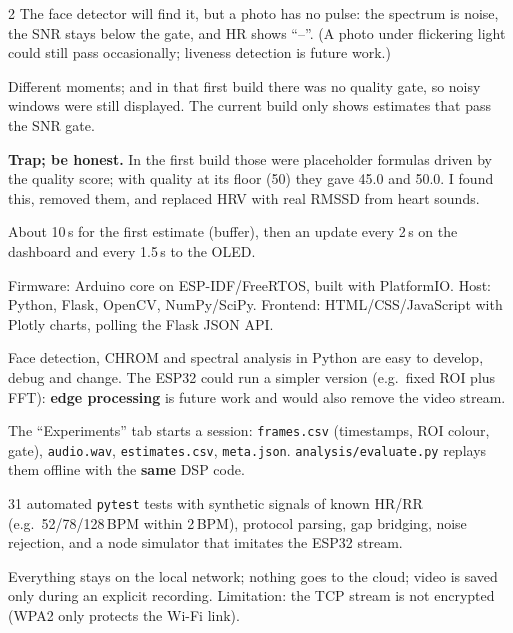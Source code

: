 \begin{multicols}{2}
{The face detector will find it, but a photo has no pulse: the spectrum is noise, the SNR stays below the gate, and HR shows
``--''. (A photo under flickering light could still pass occasionally; liveness detection is future work.)}

{Different moments; and in that first build there was no quality gate, so noisy windows were still displayed. The current
build only shows estimates that pass the SNR gate.}

{\textbf{Trap; be honest.} In the first build those were placeholder formulas driven by the quality score; with quality at its
floor (50) they gave 45.0 and 50.0. I found this, removed them, and replaced HRV with real RMSSD from heart sounds.}

{About 10\,s for the first estimate (buffer), then an update every 2\,s on the dashboard and every 1.5\,s to the OLED.}



{Firmware: Arduino core on ESP-IDF/FreeRTOS, built with PlatformIO. Host: Python, Flask, OpenCV, NumPy/SciPy. Frontend:
HTML/CSS/JavaScript with Plotly charts, polling the Flask JSON API.}

{Face detection, CHROM and spectral analysis in Python are easy to develop, debug and change. The ESP32 could run a simpler
version (e.g.\ fixed ROI plus FFT): \textbf{edge processing} is future work and would also remove the video stream.}

{The ``Experiments'' tab starts a session: \texttt{frames.csv} (timestamps, ROI colour, gate), \texttt{audio.wav},
\texttt{estimates.csv}, \texttt{meta.json}. \texttt{analysis/evaluate.py} replays them offline with the \textbf{same} DSP code.}

{31 automated \texttt{pytest} tests with synthetic signals of known HR/RR (e.g.\ 52/78/128\,BPM within 2\,BPM), protocol parsing,
gap bridging, noise rejection, and a node simulator that imitates the ESP32 stream.}

{Everything stays on the local network; nothing goes to the cloud; video is saved only during an explicit recording. Limitation:
the TCP stream is not encrypted (WPA2 only protects the Wi-Fi link).}



\end{multicols}
